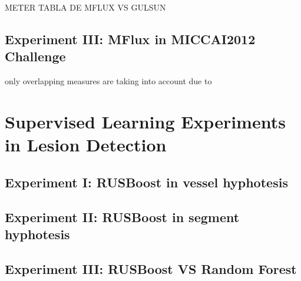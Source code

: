METER TABLA DE MFLUX VS GULSUN

\subsection{Experiment III: MFlux in MICCAI2012 Challenge}

only overlapping measures are taking into account due to 


\section{Supervised Learning Experiments in Lesion Detection}


\subsection{Experiment I: RUSBoost in vessel hyphotesis}
\subsection{Experiment II: RUSBoost in segment hyphotesis}

\subsection{Experiment III: RUSBoost VS Random Forest}



